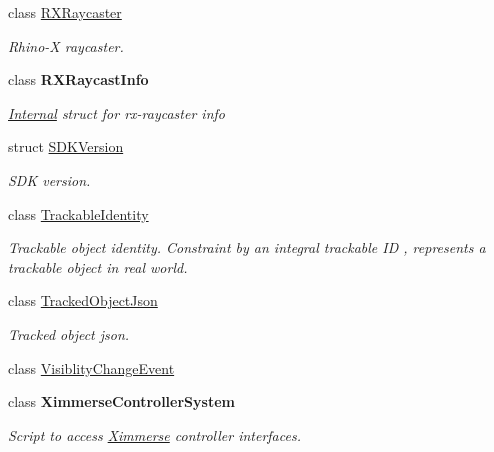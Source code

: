 \begin{DoxyCompactItemize}
class \mbox{\hyperlink{class_ximmerse_1_1_rhino_x_1_1_r_x_raycaster}{R\+X\+Raycaster}}
\begin{DoxyCompactList}\small\item\em Rhino-\/X raycaster. \end{DoxyCompactList}\item 
class {\bfseries R\+X\+Raycast\+Info}
\begin{DoxyCompactList}\small\item\em \mbox{\hyperlink{namespace_ximmerse_1_1_rhino_x_1_1_internal}{Internal}} struct for rx-\/raycaster info \end{DoxyCompactList}\item 
struct \mbox{\hyperlink{struct_ximmerse_1_1_rhino_x_1_1_s_d_k_version}{S\+D\+K\+Version}}
\begin{DoxyCompactList}\small\item\em S\+DK version. \end{DoxyCompactList}\item 
class \mbox{\hyperlink{class_ximmerse_1_1_rhino_x_1_1_trackable_identity}{Trackable\+Identity}}
\begin{DoxyCompactList}\small\item\em Trackable object identity. Constraint by an integral trackable ID , represents a trackable object in real world. \end{DoxyCompactList}\item 
class \mbox{\hyperlink{class_ximmerse_1_1_rhino_x_1_1_tracked_object_json}{Tracked\+Object\+Json}}
\begin{DoxyCompactList}\small\item\em Tracked object json. \end{DoxyCompactList}\item 
class \mbox{\hyperlink{class_ximmerse_1_1_rhino_x_1_1_visiblity_change_event}{Visiblity\+Change\+Event}}
\item 
class {\bfseries Ximmerse\+Controller\+System}
\begin{DoxyCompactList}\small\item\em Script to access \mbox{\hyperlink{namespace_ximmerse}{Ximmerse}} controller interfaces. \end{DoxyCompactList}\end{DoxyCompactItemize}
